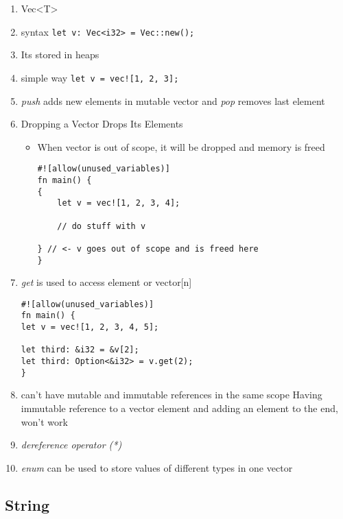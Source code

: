 \documentclass[11pt]{article}
\begin{document}
\begin{enumerate}
\item Vec<T>

\item syntax   \verb~let v: Vec<i32> = Vec::new();~

\item Its stored in heaps

\item simple way    \verb~let v = vec![1, 2, 3];~

\item \emph{push} adds new elements in mutable vector  and \emph{pop} removes last element

\item Dropping a Vector Drops Its Elements
\begin{itemize}
\item When vector is out of scope, it will be dropped and memory is freed

\begin{verbatim}
#![allow(unused_variables)]
fn main() {
{
    let v = vec![1, 2, 3, 4];

    // do stuff with v

} // <- v goes out of scope and is freed here
}
\end{verbatim}
\end{itemize}

\item \emph{get} is used to access element or vector[n] 

\begin{verbatim}
#![allow(unused_variables)]
fn main() {
let v = vec![1, 2, 3, 4, 5];

let third: &i32 = &v[2];
let third: Option<&i32> = v.get(2);
}
\end{verbatim}

\item can’t have mutable and immutable references in the same scope
Having immutable reference to  a vector element and adding an element to the end, won’t work

\item \emph{dereference operator (*)}

\item \emph{enum} can be used to store values of different types in one vector
\end{enumerate}


\subsection{String}
\label{sec-13-2}
\end{document}
